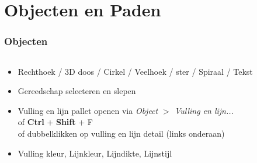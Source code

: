 \documentclass[t]{beamer}
\begin{document}
	\section{Objecten en Paden}
	\begin{frame}
		\frametitle{Objecten}
		\begin{columns}
			\begin{column}[T]{0.6\textwidth}
				\begin{itemize}
					\item Rechthoek / 3D doos / Cirkel / Veelhoek / ster / Spiraal / Tekst
					\item Gereedschap selecteren en slepen
				\end{itemize}
				\begin{itemize}
					\item Vulling en lijn pallet openen via \emph{Object $>$ Vulling en lijn...}\\
					 of \textbf{Ctrl} + \textbf{Shift} + F\\
					 of dubbelklikken op vulling en lijn detail (links onderaan)
					\item Vulling kleur, Lijnkleur, Lijndikte, Lijnstijl
				\end{itemize}
			\end{column}
			\begin{column}[T]{0.4\textwidth}

\end{column}
\end{columns}
\end{frame}
\end{document}
